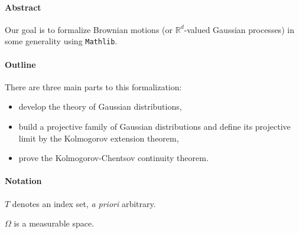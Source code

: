 %

\paragraph{Abstract}

Our goal is to formalize Brownian motions (or $\mathbb R^d$-valued Gaussian processes) in some generality using \texttt{Mathlib}.

\paragraph{Outline}

There are three main parts to this formalization:
\begin{itemize}
  \item develop the theory of Gaussian distributions,
  \item build a projective family of Gaussian distributions and define its projective limit by the Kolmogorov extension theorem,
  \item prove the Kolmogorov-Chentsov continuity theorem.
\end{itemize}

\paragraph{Notation}

$T$ denotes an index set, \emph{a priori} arbitrary.

$\Omega$ is a measurable space.





